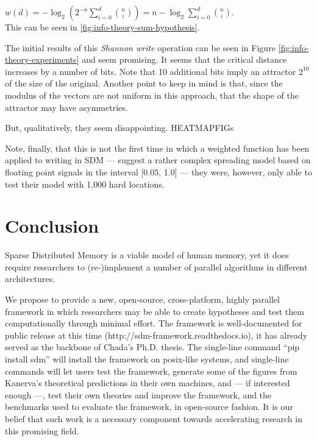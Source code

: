 $w(d) = -\log_2 \left( 2^{-n} \displaystyle\sum_{i=0}^{d}{\binom{n}{i}} \right) = n - \log_2 \displaystyle\sum_{i=0}^{d}{\binom{n}{i}}$. \\

This can be seen in \ref{fig:info-theory-sum-hypothesis}.

The initial results of this \emph{Shannon write} operation can be seen in Figure \ref{fig:info-theory-experiments} and seem promising. It seems that the critical distance increases by a number of bits.  Note that 10 additional bits imply an attractor $2^{10}$ of the size of the original. Another point to keep in mind is that, since the modulus of the vectors are not uniform in this approach, that the shape of the attractor may have asymmetries.

But, qualitatively, they seem disappointing.  HEATMAPFIGs


Note, finally, that this is not the first time in which a weighted function has been applied to writing in SDM --- \citet{hely1997new} suggest a rather complex spreading model based on floating point signals in the interval [0.05, 1.0] --- they were, however, only able to test their model with 1,000 hard locations.








\chapter{Conclusion}

Sparse Distributed Memory is a viable model of human memory, yet it does require researchers to (re-)implement a number of parallel algorithms in different architectures.

We propose to provide a new, open-source, cross-platform, highly parallel framework in which researchers may be able to create hypotheses and test them computationally through minimal effort. The framework is well-documented for public release at this time (http://sdm-framework.readthedocs.io), it has already served as the backbone of Chada's Ph.D. thesis. The single-line command ``pip install sdm'' will install the framework on posix-like systems, and single-line commands will let users test the framework, generate some of the figures from Kanerva's theoretical predictions in their own machines, and --- if interested enough ---, test their own theories and improve the framework, and the benchmarks used to evaluate the framework, in open-source fashion. It is our belief that such work is a necessary component towards accelerating research in this promising field.

